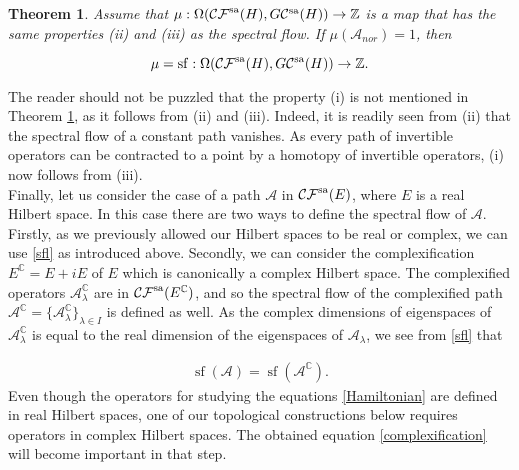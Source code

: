 \documentclass[a4paper,10pt]{article}
\newtheorem{theorem}{Theorem}[section]
\newtheorem{lemma}[theorem]{Lemma}
\DeclareMathOperator{\sfl}{sf}
\begin{document}
\begin{theorem}\label{LeschUniqueness}
Assume that $\mu:\Omega(\mathcal{CF}^\textup{sa}(H),G\mathcal{C}^\textup{sa}(H))\rightarrow\mathbb{Z}$ is a map that has the same properties (ii) and (iii) as the spectral flow. If $\mu(\mathcal{A}_{nor})=1$, then 

\[\mu=\sfl:\Omega(\mathcal{CF}^\textup{sa}(H),G\mathcal{C}^\textup{sa}(H))\rightarrow\mathbb{Z}.\]  
\end{theorem}
\noindent
The reader should not be puzzled that the property (i) is not mentioned in Theorem \ref{LeschUniqueness}, as it follows from (ii) and (iii). Indeed, it is readily seen from (ii) that the spectral flow of a constant path vanishes. As every path of invertible operators can be contracted to a point by a homotopy of invertible operators, (i) now follows from (iii).\\
Finally, let us consider the case of a path $\mathcal{A}$ in $\mathcal{CF}^\textup{sa}(E)$, where $E$ is a real Hilbert space. In this case there are two ways to define the spectral flow of $\mathcal{A}$. Firstly, as we previously allowed our Hilbert spaces to be real or complex, we can use \eqref{sfl} as introduced above. Secondly, we can consider the complexification $E^\mathbb{C}=E+iE$ of $E$ which is canonically a complex Hilbert space. The complexified operators $\mathcal{A}^\mathbb{C}_\lambda$ are in $\mathcal{CF}^\textup{sa}(E^\mathbb{C})$, and so the spectral flow of the complexified path $\mathcal{A}^\mathbb{C}=\{\mathcal{A}^\mathbb{C}_\lambda\}_{\lambda\in I}$ is defined as well. As the complex dimensions of eigenspaces of $\mathcal{A}^\mathbb{C}_\lambda$ is equal to the real dimension of the eigenspaces of $\mathcal{A}_\lambda$, we see from \eqref{sfl} that

\begin{align}\label{complexification}
\sfl(\mathcal{A})=\sfl(\mathcal{A}^\mathbb{C}).
\end{align} 
Even though the operators for studying the equations \eqref{Hamiltonian} are defined in real Hilbert spaces, one of our topological constructions below requires operators in complex Hilbert spaces. The obtained equation \eqref{complexification} will become important in that step.




\end{document}
